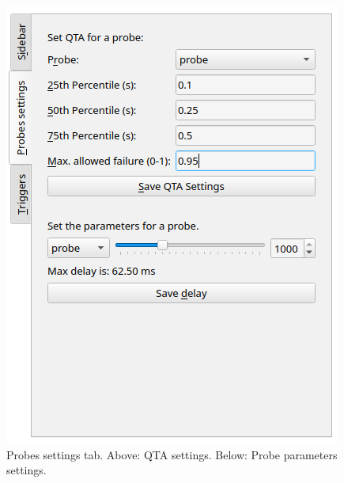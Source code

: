     \begin{figure}[H]
        \begin{center}
            \includegraphics[width = \textwidth]{img/save_qta.png}
        \end{center}
        \caption{Probes settings tab. Above: QTA settings. Below: Probe parameters settings.}
        \label{fig:qta_sett}
    \end{figure}



